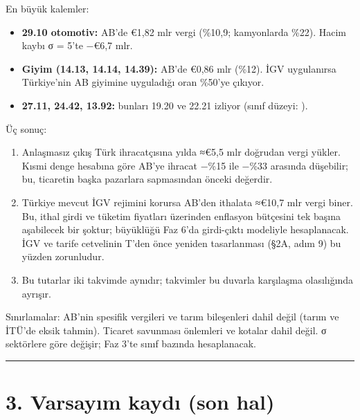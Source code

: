 \endgroup

En büyük kalemler:

\begin{itemize}
\tightlist
\item
  \textbf{29.10 otomotiv:} AB'de €1,82 mlr vergi (\%10,9; kamyonlarda \%22). Hacim kaybı σ = 5'te −€6,7 mlr.
\item
  \textbf{Giyim (14.13, 14.14, 14.39):} AB'de €0,86 mlr (\%12). İGV uygulanırsa Türkiye'nin AB giyimine uyguladığı oran \%50'ye çıkıyor.
\item
  \textbf{27.11, 24.42, 13.92:} bunları 19.20 ve 22.21 izliyor (sınıf düzeyi: ).
\end{itemize}

Üç sonuç:

\begin{enumerate}
\def\labelenumi{\arabic{enumi}.}
\tightlist
\item
  Anlaşmasız çıkış Türk ihracatçısına yılda ≈€5,5 mlr doğrudan vergi yükler. Kısmi denge hesabına göre AB'ye ihracat −\%15 ile −\%33 arasında düşebilir; bu, ticaretin başka pazarlara sapmasından önceki değerdir.
\item
  Türkiye mevcut İGV rejimini korursa AB'den ithalata ≈€10,7 mlr vergi biner. Bu, ithal girdi ve tüketim fiyatları üzerinden enflasyon bütçesini tek başına aşabilecek bir şoktur; büyüklüğü Faz 6'da girdi-çıktı modeliyle hesaplanacak. İGV ve tarife cetvelinin T'den önce yeniden tasarlanması (§2A, adım 9) bu yüzden zorunludur.
\item
  Bu tutarlar iki takvimde aynıdır; takvimler bu duvarla karşılaşma olasılığında ayrışır.
\end{enumerate}

Sınırlamalar: AB'nin spesifik vergileri ve tarım bileşenleri dahil değil (tarım ve İTÜ'de eksik tahmin). Ticaret savunması önlemleri ve kotalar dahil değil. σ sektörlere göre değişir; Faz 3'te sınıf bazında hesaplanacak.

\begin{center}\rule{0.5\linewidth}{0.5pt}\end{center}

\hypertarget{00_plan-3-varsayux131m-kaydux131-son-hal}{%
\section{3. Varsayım kaydı (son hal)}\label{00_plan-3-varsayux131m-kaydux131-son-hal}}

